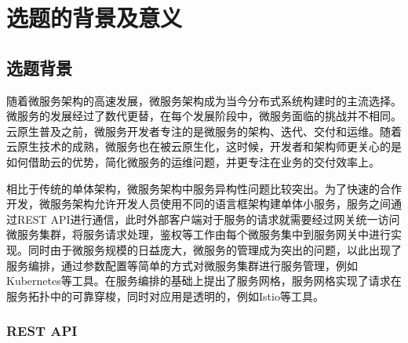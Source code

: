 \section{选题的背景及意义}

\subsection{选题背景}

随着微服务架构的高速发展，微服务架构成为当今分布式系统构建时的主流选择。微服务的发展经过了数代更替，在每个发展阶段中，微服务面临的挑战并不相同。云原生普及之前，微服务开发者专注的是微服务的架构、迭代、交付和运维。随着云原生技术的成熟，微服务也在被云原生化，这时候，开发者和架构师更关心的是如何借助云的优势，简化微服务的运维问题，并更专注在业务的交付效率上。

相比于传统的单体架构，微服务架构中服务异构性问题比较突出。为了快速的合作开发，微服务架构允许开发人员使用不同的语言框架构建单体小服务，服务之间通过REST API进行通信，此时外部客户端对于服务的请求就需要经过网关统一访问微服务集群，将服务请求处理，鉴权等工作由每个微服务集中到服务网关中进行实现。同时由于微服务规模的日益庞大，微服务的管理成为突出的问题，以此出现了服务编排，通过参数配置等简单的方式对微服务集群进行服务管理，例如Kubernetes等工具。在服务编排的基础上提出了服务网格，服务网格实现了请求在服务拓扑中的可靠穿梭，同时对应用是透明的，例如Istio等工具。

\subsubsection{REST API}

